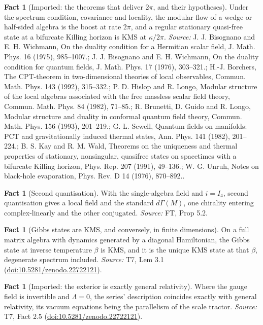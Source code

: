 \documentclass[11pt]{article}
\theoremstyle{definition}
\newtheorem{fact}[theorem]{Fact}
\theoremstyle{plain}
\begin{document}
\begin{fact}[Imported: the theorems that deliver $2\pi$, and their hypotheses]\label{c:angle.imported-theorems-deliver-their-hypotheses}
Under the spectrum condition, covariance and locality, the modular flow of a wedge or half-sided algebra is the boost at rate $2\pi$, and a regular stationary quasi-free state at a bifurcate Killing horizon is KMS at $\kappa/2\pi$.
\emph{Source:} J. J. Bisognano and E. H. Wichmann, On the duality condition for a Hermitian scalar field, J. Math. Phys. 16 (1975), 985--1007.; J. J. Bisognano and E. H. Wichmann, On the duality condition for quantum fields, J. Math. Phys. 17 (1976), 303--321.; H.-J. Borchers, The CPT-theorem in two-dimensional theories of local observables, Commun. Math. Phys. 143 (1992), 315--332.; P. D. Hislop and R. Longo, Modular structure of the local algebras associated with the free massless scalar field theory, Commun. Math. Phys. 84 (1982), 71--85.; R. Brunetti, D. Guido and R. Longo, Modular structure and duality in conformal quantum field theory, Commun. Math. Phys. 156 (1993), 201--219.; G. L. Sewell, Quantum fields on manifolds: PCT and gravitationally induced thermal states, Ann. Phys. 141 (1982), 201--224.; B. S. Kay and R. M. Wald, Theorems on the uniqueness and thermal properties of stationary, nonsingular, quasifree states on spacetimes with a bifurcate Killing horizon, Phys. Rep. 207 (1991), 49--136.; W. G. Unruh, Notes on black-hole evaporation, Phys. Rev. D 14 (1976), 870--892..
\end{fact}

\begin{fact}[Second quantisation]\label{c:field-theory.second-quantisation}
With the single-algebra field and $i = I_4$, second quantisation gives a local field and the standard $d\Gamma(M)$, one chirality entering complex-linearly and the other conjugated.
\emph{Source:} FT, Prop 5.2.
\end{fact}

\begin{fact}[Gibbs states are KMS, and conversely, in finite dimensions]\label{c:hawking.gibbs-states-are-kms-conversely-finite}
On a full matrix algebra with dynamics generated by a diagonal Hamiltonian, the Gibbs state at inverse temperature $\beta$ is KMS, and it is the unique KMS state at that $\beta$, degenerate spectrum included.
\emph{Source:} T7, Lem 3.1 (\href{https://doi.org/10.5281/zenodo.22722121}{doi:10.5281/zenodo.22722121}).
\end{fact}

\begin{fact}[Imported: the exterior is exactly general relativity]\label{c:hawking.imported-exterior-exactly-general-relativity}
Where the gauge field is invertible and $\Lambda = 0$, the series' description coincides exactly with general relativity, its vacuum equations being the parallelism of the scale tractor.
\emph{Source:} T7, Fact 2.5 (\href{https://doi.org/10.5281/zenodo.22722121}{doi:10.5281/zenodo.22722121}).
\end{fact}
\end{document}
